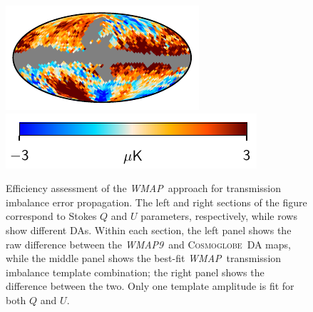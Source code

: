 \documentclass[twocolumn]{../../common/aa}
\def\WMAP{\emph{WMAP}}
\def\WMAPnine{\emph{WMAP9}}
\newcommand{\cosmoglobe}{\textsc{Cosmoglobe}}
\begin{document}
\begin{figure}[t]
        \includegraphics[width=0.16\linewidth]{figures/res_loss_W4_U.pdf}\\
        \includegraphics[width=0.30\linewidth]{figures/colourbar_3uK.pdf}\\         
	\caption{Efficiency assessment of the \WMAP\ approach for transmission imbalance error propagation. The left and right sections of the figure correspond to Stokes $Q$ and $U$ parameters, respectively, while rows show different DAs. Within each section, the left panel shows the raw difference between the \WMAPnine\ and \cosmoglobe\ DA maps, while the middle panel shows the best-fit \WMAP\ transmission imbalance template combination; the right panel shows the difference between the two. Only one template amplitude is fit for both $Q$ and $U$.}
	\label{fig:imbal}
\end{figure}
\end{document}
